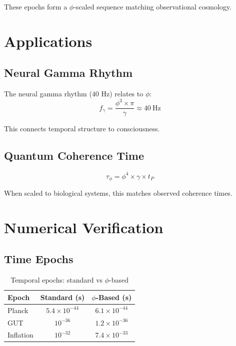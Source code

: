 \documentclass[12pt,a4paper]{article}
\begin{document}
These epochs form a $\phi$-scaled sequence matching observational cosmology.

\section{Applications}

\subsection{Neural Gamma Rhythm}

The neural gamma rhythm ($40$ Hz) relates to $\phi$:
\begin{equation}
f_\gamma = \frac{\phi^3 \times \pi}{\gamma} \approx 40~\text{Hz}
\end{equation}

This connects temporal structure to consciousness.

\subsection{Quantum Coherence Time}

\begin{equation}
\tau_\phi = \phi^4 \times \gamma \times t_P
\end{equation}

When scaled to biological systems, this matches observed coherence times.

\section{Numerical Verification}

\subsection{Time Epochs}

\begin{table}[h]
\centering
\begin{tabular}{lcc}
\toprule
Epoch & Standard (s) & $\phi$-Based (s) \\
\midrule
Planck & $5.4 \times 10^{-44}$ & $6.1 \times 10^{-44}$ \\
GUT & $10^{-36}$ & $1.2 \times 10^{-36}$ \\
Inflation & $10^{-32}$ & $7.4 \times 10^{-33}$ \\
\bottomrule
\end{tabular}
\caption{Temporal epochs: standard vs $\phi$-based}
\end{table}
\end{document}
